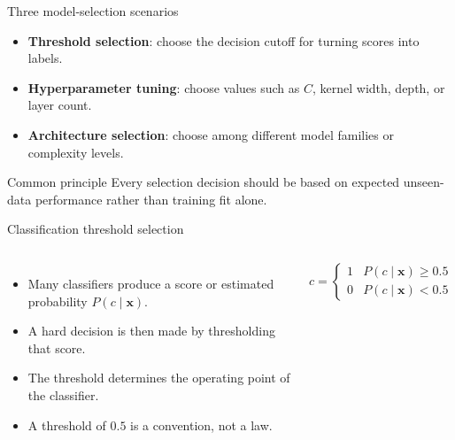 \documentclass[12pt]{beamer}
\begin{document}
\begin{frame}{Three model-selection scenarios}
  \begin{itemize}
    \item \textbf{Threshold selection}: choose the decision cutoff for turning scores into labels.
    \item \textbf{Hyperparameter tuning}: choose values such as $C$, kernel width, depth, or layer count.
    \item \textbf{Architecture selection}: choose among different model families or complexity levels.
  \end{itemize}
  \begin{conceptbox}{Common principle}
    Every selection decision should be based on expected unseen-data performance rather than training fit alone.
  \end{conceptbox}
\end{frame}

\begin{frame}{Classification threshold selection}
  \begin{columns}[T]
      \begin{itemize}
        \item Many classifiers produce a score or estimated probability $P(c\mid\bm{x})$.
        \item A hard decision is then made by thresholding that score.
        \item The threshold determines the operating point of the classifier.
        \item A threshold of $0.5$ is a convention, not a law.
      \end{itemize}
      \[
        c =
        \begin{cases}
          1 & P(c\mid\bm{x}) \geq 0.5 \\
          0 & P(c\mid\bm{x}) < 0.5
        \end{cases}
      \]
      \centering
  \end{columns}
\end{frame}
\end{document}
